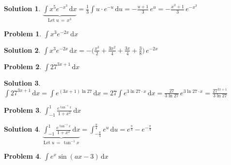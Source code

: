\documentclass[11pt,a4paper]{article}
\newcommand{\ds}{\displaystyle}
\theoremstyle{definition}
\newtheorem*{problem}{Problem}
\newtheorem*{solution}{Solution}
\begin{document}
\begin{solution}
  $\ds\underbrace{\int\!x^5 e^{-x^3}\,\text{d}x}_{\text{Let}\;u\,=\,x^3} = \frac{1}{3}\int\!u\cdot e^{-u}\,\text{d}u = -\frac{u + 1}{3}\,e^u = -\frac{x^3 + 1}{3}\,e^{-x^3}$
\end{solution}

\begin{problem}
  $\ds\int\!x^3 e^{-2x}\,\text{d}x$
\end{problem}

\begin{solution}
  $\ds\int\!x^3 e^{-2x}\,\text{d}x = -\Big(\frac{x^3}{2} + \frac{3x^2}{4} + \frac{3x}{4} + \frac{3}{8}\Big)\,e^{-2x}$
\end{solution}

%

\begin{problem}
  $\ds\int{27}^{3x+1}\,\text{d}x$
\end{problem}

\begin{solution}
  $\ds\int{27}^{3x+1}\,\text{d}x = \int\!e^{(3 x + 1)\ln 27}\,\text{d}x = 27\int\!e^{3\ln 27\cdot x}\,\text{d}x = \frac{27}{3\ln 27}\,e^{3\ln 27\cdot x} = \frac{27^{3x + 1}}{3\ln 27}$
\end{solution}

\begin{problem}
  $\ds\int_{-1}^1\frac{e^{\tan^{-1} x}}{1 + x^2} \,\text{d}x$
\end{problem}

\begin{solution}
  $\ds\underbrace{\int_{-1}^1\frac{e^{\tan^{-1} x}}{1 + x^2} \,\text{d}x}_{\text{Let}\;u\,=\,\tan^{-1}x} = \int_{-\frac{\pi}{4}}^{\frac{\pi}{4}}\!e^u\,\text{d}u = e^{\frac{\pi}{4}} - e^{-\frac{\pi}{4}}$
\end{solution}

\begin{problem}
  $\ds\int\!e^x \sin(ax - 3)\,\text{d}x$
\end{problem}
\end{document}
